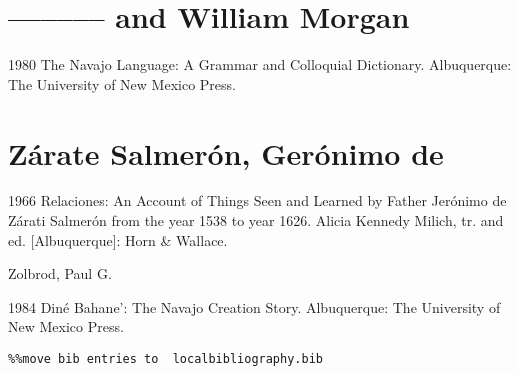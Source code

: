 \section{–––––– and William Morgan}

1980  The Navajo Language: A Grammar and Colloquial Dictionary.  Albuquerque:  The University of New Mexico Press.

\section{Zárate Salmerón, Gerónimo de}

1966  Relaciones: An Account of Things Seen and Learned by Father Jerónimo de Zárati Salmerón from the year 1538 to year 1626.  Alicia Kennedy Milich, tr. and ed.  [Albuquerque]:  Horn \& Wallace.

Zolbrod, Paul G.  

1984  Diné Bahane’: The Navajo Creation Story.  Albuquerque:  The University of New Mexico Press.


\begin{verbatim}%%move bib entries to  localbibliography.bib
\end{verbatim} 